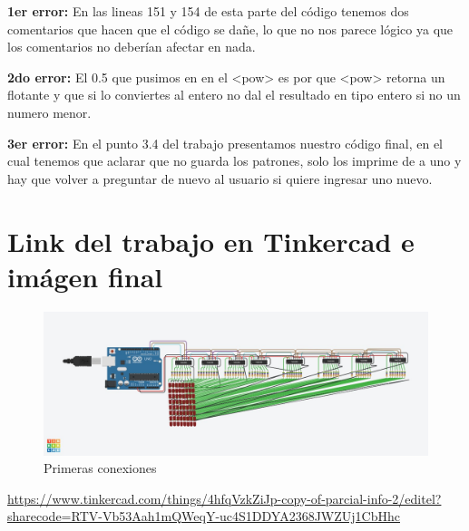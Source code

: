 \documentclass{article}
\begin{document}
\textbf{1er error: } En las lineas 151 y 154 de esta parte del código tenemos dos comentarios que hacen que el código se dañe, lo que no nos parece lógico ya que los comentarios no deberían afectar en nada. 
 
\textbf{2do error: } El 0.5 que pusimos en en el <pow> es por que <pow> retorna un flotante y que si lo conviertes al entero no dal el resultado en tipo entero si no un numero menor. 

\textbf{3er error: } En el punto 3.4 del trabajo presentamos nuestro código final, en el cual tenemos que aclarar que no guarda los patrones, solo los imprime de a uno y hay que volver a preguntar de nuevo al usuario si quiere ingresar uno nuevo.

\newpage
\section{Link del trabajo en Tinkercad e imágen final} \label{codigo}
\begin{figure}[h]
\includegraphics[width=15cm]{Final.jpeg}
\centering
\caption{Primeras conexiones}
\label{fig:Final.jpeg}
\end{figure}

\url{https://www.tinkercad.com/things/4hfqVzkZiJp-copy-of-parcial-info-2/editel?sharecode=RTV-Vb53Aah1mQWeqY-uc4S1DDYA2368JWZUj1CbHhc}
\end{document}
